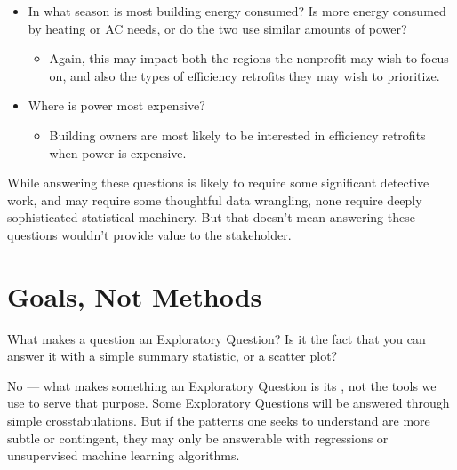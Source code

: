 \documentclass[letterpaper,10pt,english]{jupyterBook}
\begin{document}
\begin{itemize}
\begin{itemize}
\end{itemize}

\item {} 
\sphinxAtStartPar
In what season is most building energy consumed? Is more energy consumed by heating or AC needs, or do the two use similar amounts of power?
\begin{itemize}
\item {} 
\sphinxAtStartPar
Again, this may impact both the regions the non\sphinxhyphen{}profit may wish to focus on, and also the types of efficiency retrofits they may wish to prioritize.

\end{itemize}

\item {} 
\sphinxAtStartPar
Where is power most expensive?
\begin{itemize}
\item {} 
\sphinxAtStartPar
Building owners are most likely to be interested in efficiency retrofits when power is expensive.

\end{itemize}

\end{itemize}

\sphinxAtStartPar
While answering these questions is likely to require some significant detective work, and may require some thoughtful data wrangling, none require deeply sophisticated statistical machinery. But that doesn’t mean answering these questions wouldn’t provide  value to the stakeholder.


\section{Goals, Not Methods}
\label{\detokenize{30_questions/10_using_exploratory_questions:goals-not-methods}}
\sphinxAtStartPar
What makes a question an Exploratory Question? Is it the fact that you can answer it with a simple summary statistic, or a scatter plot?

\sphinxAtStartPar
No — what makes something an Exploratory Question is its , not the tools we use to serve that purpose. Some Exploratory Questions will be answered through simple cross\sphinxhyphen{}tabulations. But if the patterns one seeks to understand are more subtle or contingent, they may only be answerable with regressions or unsupervised machine learning algorithms.
\end{document}

